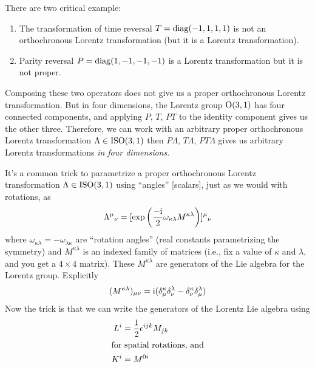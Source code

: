 There are two critical example:
\begin{enumerate}
\item The transformation of time reversal $T=\operatorname{diag}(-1,1,1,1)$ is not an
  orthochronous Lorentz transformation (but it is a Lorentz transformation).
\item Parity reversal $P=\operatorname{diag}(1,-1,-1,-1)$ is a Lorentz transformation
  but it is not proper.
\end{enumerate}
Composing these two operators does not give us a proper orthochronous
Lorentz transformation. But in four dimensions, the Lorentz group
$\mathrm{O}(3,1)$ has four connected components, and applying $P$, $T$, $PT$ to
the identity component gives us the other three. Therefore, we can work
with an arbitrary proper orthochronous Lorentz transformation
$\Lambda\in\mathrm{ISO}(3,1)$ then $P\Lambda$, $T\Lambda$, $PT\Lambda$ gives us
arbitrary Lorentz transformations \emph{in four dimensions}.

It's a common trick to parametrize a proper orthochronous Lorentz
transformation $\Lambda\in\mathrm{ISO}(3,1)$ using 
``angles'' [scalars], just as we would with rotations, as
\begin{equation}
{\Lambda^{\mu}}_{\nu} = [\exp\left(\frac{-\mathrm{i}}{2}\omega_{\kappa\lambda}M^{\kappa\lambda}\right)]{{}^{\mu}}_{\nu}
\end{equation}
where $\omega_{\kappa\lambda}=-\omega_{\lambda\kappa}$ are ``rotation
angles'' (real constants parametrizing the symmetry) and
$M^{\kappa\lambda}$ is an indexed family of matrices (i.e., fix a value
of $\kappa$ and $\lambda$, and you get a $4\times4$ matrix). These $M^{\kappa\lambda}$ are
generators of the Lie algebra for the Lorentz group. Explicitly
\begin{equation}
(M^{\kappa\lambda})_{\mu\nu} = \mathrm{i}(\delta^{\kappa}_{\mu}\delta^{\lambda}_{\nu}-\delta^{\kappa}_{\nu}\delta^{\lambda}_{\mu})
\end{equation}
Now the trick is that we can write the generators of the Lorentz Lie
algebra using
\begin{subequations}\label{eq:rqm:poincare-algebra:rotations-and-boosts-generators}
\begin{align}
L^{i} &= \frac{1}{2}\epsilon^{ijk}M_{jk}\\
\intertext{for spatial rotations, and}
K^{i} &= M^{0i}%
\end{align}
\end{subequations}

